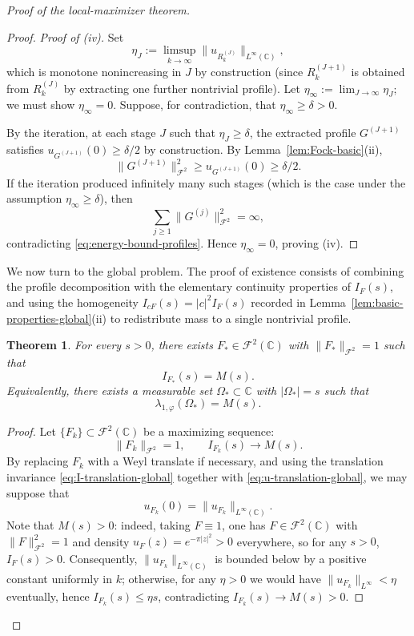 \documentclass[a4paper,11pt,reqno]{amsart}
\numberwithin{equation}{section}
\theoremstyle{plain} %
\newtheorem{theorem}{Theorem}
\theoremstyle{definition} %
\theoremstyle{remark}
\newcommand{\C}{\mathbb{C}}
\begin{document}
\begin{proof}[Proof of the local-maximizer theorem]
\begin{proof}
\medskip
\noindent\emph{Proof of (iv).}
Set
\[
\eta_J:=\limsup_{k\to\infty}\|u_{R_k^{(J)}}\|_{L^\infty(\C)},
\]
which is monotone nonincreasing in \(J\) by construction (since
\(R_k^{(J+1)}\) is obtained from \(R_k^{(J)}\) by extracting one further
nontrivial profile). Let \(\eta_\infty:=\lim_{J\to\infty}\eta_J\); we must
show \(\eta_\infty=0\). Suppose, for contradiction, that
\(\eta_\infty\ge \delta>0\).

By the iteration, at each stage \(J\) such that \(\eta_J\ge \delta\), the
extracted profile \(G^{(J+1)}\) satisfies \(u_{G^{(J+1)}}(0)\ge \delta/2\) by
construction. By Lemma~\ref{lem:Fock-basic}(ii),
\[
\|G^{(J+1)}\|_{\mathcal F^2}^2 \ge u_{G^{(J+1)}}(0)\ge \delta/2.
\]
If the iteration produced infinitely many such stages (which is the case
under the assumption \(\eta_\infty\ge \delta\)), then
\[
\sum_{j\ge 1}\|G^{(j)}\|_{\mathcal F^2}^2=\infty,
\]
contradicting \eqref{eq:energy-bound-profiles}. Hence \(\eta_\infty=0\),
proving (iv).
\end{proof}

We now turn to the global problem. The proof of existence consists of
combining the profile decomposition with the elementary continuity properties
of \(I_F(s)\), and using the homogeneity \(I_{cF}(s)=|c|^2 I_F(s)\) recorded
in Lemma~\ref{lem:basic-properties-global}(ii) to redistribute mass to a
single nontrivial profile.

\begin{theorem}\label{thm:existence-global-maximizer}
For every \(s>0\), there exists \(F_*\in \mathcal F^2(\C)\) with
\(\|F_*\|_{\mathcal F^2}=1\) such that
\[
I_{F_*}(s)=M(s).
\]
Equivalently, there exists a measurable set \(\Omega_*\subset \C\) with
\(|\Omega_*|=s\) such that
\[
\lambda_{1,\varphi}(\Omega_*)=M(s).
\]
\end{theorem}

\begin{proof}
Let \(\{F_k\}\subset \mathcal F^2(\C)\) be a maximizing sequence:
\[
\|F_k\|_{\mathcal F^2}=1,
\qquad
I_{F_k}(s)\to M(s).
\]
By replacing \(F_k\) with a Weyl translate if necessary, and using the
translation invariance \eqref{eq:I-translation-global} together with
\eqref{eq:u-translation-global}, we may suppose that
\[
u_{F_k}(0)=\|u_{F_k}\|_{L^\infty(\C)}.
\]
Note that \(M(s)>0\): indeed, taking \(F\equiv 1\), one has
\(F\in \mathcal F^2(\C)\) with \(\|F\|_{\mathcal F^2}^2=1\) and density
\(u_F(z)=e^{-\pi |z|^2}>0\) everywhere, so for any \(s>0\), \(I_F(s)>0\).
Consequently, \(\|u_{F_k}\|_{L^\infty(\C)}\) is bounded below by a positive
constant uniformly in \(k\); otherwise, for any \(\eta>0\) we would have
\(\|u_{F_k}\|_{L^\infty}<\eta\) eventually, hence \(I_{F_k}(s)\le \eta s\),
contradicting \(I_{F_k}(s)\to M(s)>0\).


\end{proof}
\end{proof}
\end{document}
